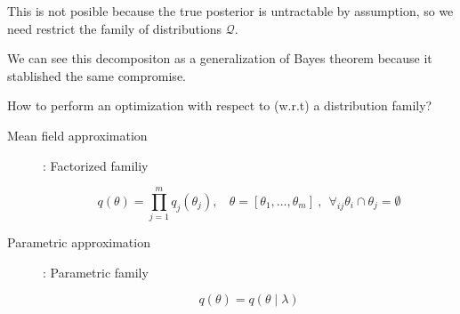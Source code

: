 \vspace{0.3cm}

This is not posible because the true posterior is untractable by assumption, so we need restrict the family of distributions $\mathcal{Q}$.

\vspace{0.3cm}

We can see this decompositon as a generalization of Bayes theorem because it stablished the same compromise.

\begin{framed}
 \centering
 How to perform an optimization with respect to (w.r.t) a distribution family?
\end{framed}

\begin{description}
 \item[Mean field approximation]: Factorized familiy
 
 \begin{equation}
  q(\theta) = \prod_{j=1}^m q_j(\theta_j), \ \ \ \ \theta = [\theta_1, \dots, \theta_m] \ , \ \  \forall_{ij} \theta_i \cap \theta_j = \emptyset
 \end{equation}

 \item[Parametric approximation]: Parametric family
 
 \begin{equation}
  q(\theta) = q(\theta \mid \lambda)
 \end{equation}

 
\end{description}












